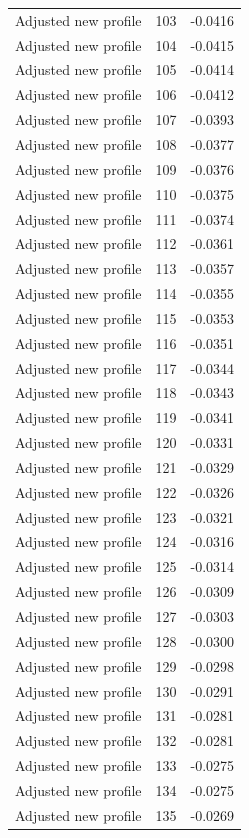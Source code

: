 \begin{table}[htbp]
\begin{tabular}{lll}
Adjusted new profile & 103 & -0.0416 \\
Adjusted new profile & 104 & -0.0415 \\
Adjusted new profile & 105 & -0.0414 \\
Adjusted new profile & 106 & -0.0412 \\
Adjusted new profile & 107 & -0.0393 \\
Adjusted new profile & 108 & -0.0377 \\
Adjusted new profile & 109 & -0.0376 \\
Adjusted new profile & 110 & -0.0375 \\
Adjusted new profile & 111 & -0.0374 \\
Adjusted new profile & 112 & -0.0361 \\
Adjusted new profile & 113 & -0.0357 \\
Adjusted new profile & 114 & -0.0355 \\
Adjusted new profile & 115 & -0.0353 \\
Adjusted new profile & 116 & -0.0351 \\
Adjusted new profile & 117 & -0.0344 \\
Adjusted new profile & 118 & -0.0343 \\
Adjusted new profile & 119 & -0.0341 \\
Adjusted new profile & 120 & -0.0331 \\
Adjusted new profile & 121 & -0.0329 \\
Adjusted new profile & 122 & -0.0326 \\
Adjusted new profile & 123 & -0.0321 \\
Adjusted new profile & 124 & -0.0316 \\
Adjusted new profile & 125 & -0.0314 \\
Adjusted new profile & 126 & -0.0309 \\
Adjusted new profile & 127 & -0.0303 \\
Adjusted new profile & 128 & -0.0300 \\
Adjusted new profile & 129 & -0.0298 \\
Adjusted new profile & 130 & -0.0291 \\
Adjusted new profile & 131 & -0.0281 \\
Adjusted new profile & 132 & -0.0281 \\
Adjusted new profile & 133 & -0.0275 \\
Adjusted new profile & 134 & -0.0275 \\
Adjusted new profile & 135 & -0.0269 \\

\end{tabular}
\end{table}
